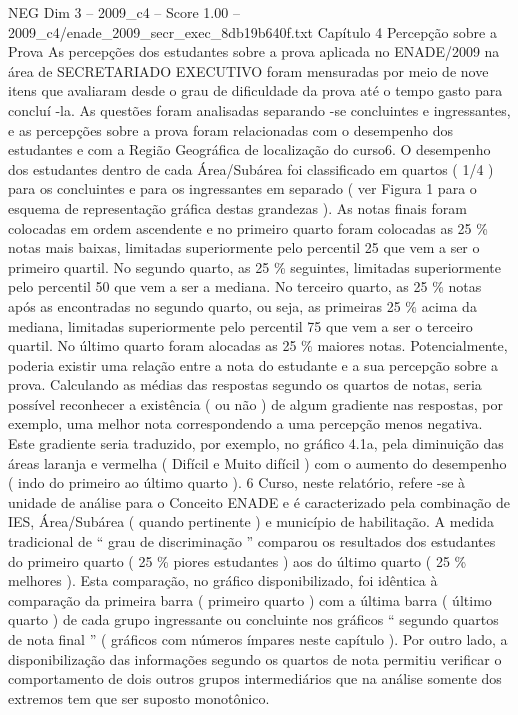 \begin{textsample}{NEG Dim 3 – 2009\_c4 – Score 1.00 – 2009\_c4/enade\_2009\_secr\_exec\_8db19b640f.txt}  \label{ex:f3_neg_164}
Capítulo 4 Percepção sobre a Prova As percepções dos estudantes sobre a prova aplicada no ENADE/2009 na área de SECRETARIADO EXECUTIVO foram mensuradas por meio de nove itens que avaliaram desde o grau de dificuldade da prova até o tempo gasto para concluí -la.
As questões foram analisadas separando -se concluintes e ingressantes, e as percepções sobre a prova foram relacionadas com o desempenho dos estudantes e com a Região Geográfica de localização do curso6.
O desempenho dos estudantes dentro de cada Área/Subárea foi classificado em quartos ( 1/4 ) para os concluintes e para os ingressantes em separado ( ver Figura 1 para o esquema de representação gráfica destas grandezas ).
As notas finais foram colocadas em ordem ascendente e no primeiro quarto foram colocadas as 25 \% notas mais baixas, limitadas superiormente pelo percentil 25 que vem a ser o primeiro quartil.
No segundo quarto, as 25 \% seguintes, limitadas superiormente pelo percentil 50 que vem a ser a mediana.
No terceiro quarto, as 25 \% notas após as encontradas no segundo quarto, ou seja, as primeiras 25 \% acima da mediana, limitadas superiormente pelo percentil 75 que vem a ser o terceiro quartil.
No último quarto foram alocadas as 25 \% maiores notas.
Potencialmente, poderia existir uma relação entre a nota do estudante e a sua percepção sobre a prova.
Calculando as médias das respostas segundo os quartos de notas, seria possível reconhecer a existência ( ou não ) de algum gradiente nas respostas, por exemplo, uma melhor nota correspondendo a uma percepção menos negativa.
Este gradiente seria traduzido, por exemplo, no gráfico 4.1a, pela diminuição das áreas laranja e vermelha ( Difícil e Muito difícil ) com o aumento do desempenho ( indo do primeiro ao último quarto ). 6 Curso, neste relatório, refere -se à unidade de análise para o Conceito ENADE e é caracterizado pela combinação de IES, Área/Subárea ( quando pertinente ) e município de habilitação.
A medida tradicional de “ grau de discriminação ” comparou os resultados dos estudantes do primeiro quarto ( 25 \% piores estudantes ) aos do último quarto ( 25 \% melhores ).
Esta comparação, no gráfico disponibilizado, foi idêntica à comparação da primeira barra ( primeiro quarto ) com a última barra ( último quarto ) de cada grupo ingressante ou concluinte nos gráficos “ segundo quartos de nota final ” ( gráficos com números ímpares neste capítulo ).
Por outro lado, a disponibilização das informações segundo os quartos de nota permitiu verificar o comportamento de dois outros grupos intermediários que na análise somente dos extremos tem que ser suposto monotônico.

\end{textsample}
